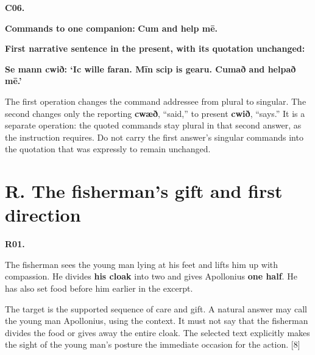 \par\begin{minipage}{\linewidth}\raggedright
\textbf{C06.}

\textbf{Commands to one companion:} \textbf{Cum and help mē.}

\textbf{First narrative sentence in the present, with its quotation unchanged:}

\textbf{Se mann cwið: ‘Ic wille faran. Mīn scip is gearu. Cumað and helpað mē.’}

The first operation changes the command addressee from plural to singular. The second changes only the reporting \textbf{cwæð}, “said,” to present \textbf{cwið}, “says.” It is a separate operation: the quoted commands stay plural in that second answer, as the instruction requires. Do not carry the first answer’s singular commands into the quotation that was expressly to remain unchanged.

\end{minipage}\par\addvspace{4pt}

\section*{R. The fisherman’s gift and first direction}

\par\begin{minipage}{\linewidth}\raggedright
\textbf{R01.}

The fisherman sees the young man lying at his feet and lifts him up with compassion. He divides \textbf{his cloak} into two and gives Apollonius \textbf{one half}. He has also set food before him earlier in the excerpt.

The target is the supported sequence of care and gift. A natural answer may call the young man Apollonius, using the context. It must not say that the fisherman divides the food or gives away the entire cloak. The selected text explicitly makes the sight of the young man’s posture the immediate occasion for the action. [8]

\end{minipage}\par\addvspace{4pt}

